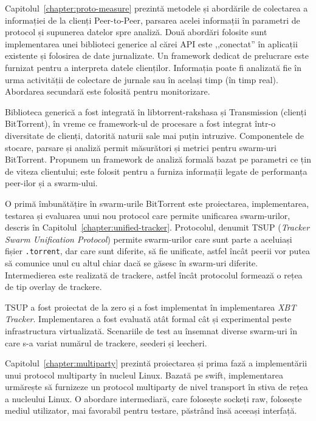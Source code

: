 Capitolul~\ref{chapter:proto-measure} prezintă metodele și abordările de
colectarea a informației de la clienți Peer-to-Peer, parsarea acelei
informații în parametri de protocol și supunerea datelor spre analiză. Două
abordări folosite sunt implementarea unei biblioteci generice al cărei API
este ,,conectat'' în aplicații existente și folosirea de date jurnalizate. Un
framework dedicat de prelucrare este furnizat pentru a interpreta datele
clienților. Informația poate fi analizată fie în urma activității de colectare
de jurnale sau în același timp (în timp real). Abordarea secundară este
folosită pentru monitorizare.

Biblioteca generică a fost integrată în libtorrent-rakshasa și Transmission
(clienți BitTorrent), în vreme ce framework-ul de procesare a fost integrat
într-o diversitate de clienți, datorită naturii sale mai puțin intruzive.
Componentele de stocare, parsare și analiză permit măsurători și metrici
pentru swarm-uri BitTorrent. Propunem un framework de analiză formală bazat pe
parametri ce țin de viteza clientului; este folosit pentru a furniza
informații legate de performanța peer-ilor și a swarm-ului.

O primă îmbunătățire în swarm-urile BitTorrent este proiectarea,
implementarea, testarea și evaluarea unui nou protocol care permite unificarea
swarm-urilor, descris în Capitolul~\ref{chapter:unified-tracker}. Protocolul,
denumit TSUP
(\textit{Tracker Swarm Unification Protocol}) permite swarm-urilor care sunt
parte a aceluiași fișier \texttt{.torrent}, dar care sunt diferite, să fie
unificate, astfel încât peerii vor putea să comunice unul cu altul chiar dacă
se găsesc în swarm-uri diferite. Intermedierea este realizată de trackere,
astfel încât protocolul formează o rețea de tip overlay de trackere.

TSUP a fost proiectat de la zero și a fost implementat în implementarea
\textit{XBT Tracker}. Implementarea a fost evaluată atât formal cât și
experimental peste infrastructura virtualizată. Scenariile de test au însemnat
diverse swarm-uri în care s-a variat numărul de trackere, seederi și leecheri.

Capitolul~\ref{chapter:multiparty} prezintă proiectarea și prima fază a
implementării unui protocol multiparty în nucleul Linux. Bazată pe swift,
implementarea urmărește să furnizeze un protocol multiparty de nivel transport
în stiva de rețea a nucleului Linux. O abordare intermediară, care folosește
sockeți raw, folosește mediul utilizator, mai favorabil pentru testare,
păstrând însă aceeași interfață.

